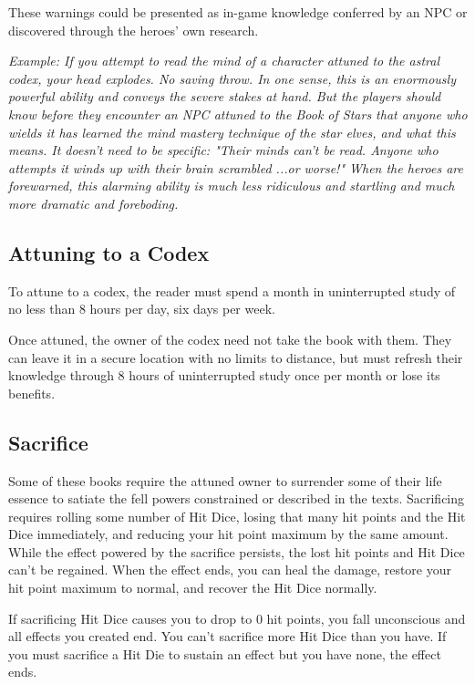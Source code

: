 \documentclass[10pt,a4paper,twoside,bg=print,twocolumn,openany,nodeprecatedcode]{dndbook}
\begin{document}
These warnings could be presented as in-game knowledge conferred by an NPC or discovered through the heroes' own research.

\textit{Example: If you attempt to read the mind of a character attuned to the \textit{astral codex}, your head explodes. No saving throw. In one sense, this is an enormously powerful ability and conveys the severe stakes at hand. But the players should know before they encounter an NPC attuned to the Book of Stars that anyone who wields it has learned the mind mastery technique of the star elves, and what this means. It doesn't need to be specific: "Their minds can't be read. Anyone who attempts it winds up with their brain scrambled ...or worse!" When the heroes are forewarned, this alarming ability is much less ridiculous and startling and much more dramatic and foreboding.}

\subsection{Attuning to a Codex}
To attune to a codex, the reader must spend a month in uninterrupted study of no less than 8 hours per day, six days per week.

Once attuned, the owner of the codex need not take the book with them. They can leave it in a secure location with no limits to distance, but must refresh their knowledge through 8 hours of uninterrupted study once per month or lose its benefits.

\subsection{Sacrifice}
Some of these books require the attuned owner to surrender some of their life essence to satiate the fell powers constrained or described in the texts. Sacrificing requires rolling some number of Hit Dice, losing that many hit points and the Hit Dice immediately, and reducing your hit point maximum by the same amount. While the effect powered by the sacrifice persists, the lost hit points and Hit Dice can't be regained. When the effect ends, you can heal the damage, restore your hit point maximum to normal, and recover the Hit Dice normally.

If sacrificing Hit Dice causes you to drop to 0 hit points, you fall unconscious and all effects you created end. You can't sacrifice more Hit Dice than you have. If you must sacrifice a Hit Die to sustain an effect but you have none, the effect ends.
\end{document}
